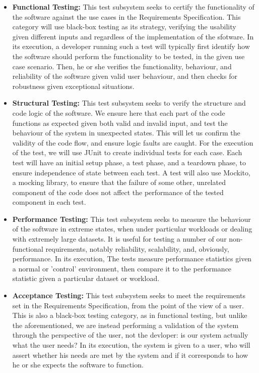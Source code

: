 \documentclass[12pt]{article}
\newcounter{req ID}
\begin{document}
\begin{itemize}
    \item \textbf{Functional Testing:} This test subsystem seeks to certify the functionality of the software against the use cases in the Requirements Specification. This category will use black-box testing as its strategy, verifying the usability given different inputs and regardless of the implementation of the sfotware. In its execution, a developer running such a test will typically first identify how the software should perform the functionality to be tested, in the given use case scenario. Then, he or she verifies the functionality, behaviour, and reliability of the software given valid user behaviour, and then checks for robustness given exceptional situations.
    \item \textbf{Structural Testing:} This test subsystem seeks to verify the structure and code logic of the software. We ensure here that each part of the code functions as expected given both valid and invalid input, and test the behaviour of the system in unexpected states. This will let us confirm the validity of the code flow, and ensure logic faults are caught. For the execution of the test, we will use JUnit to create individual tests for each case. Each test will have an initial setup phase, a test phase, and a teardown phase, to ensure independence of state between each test. A test will also use Mockito, a mocking library, to ensure that the failure of some other, unrelated component of the code does not affect the performance of the tested component in each test.
    \item \textbf{Performance Testing:} This test subsystem seeks to measure the behaviour of the software in extreme states, when under particular workloads or dealing with extremely large datasets. It is useful for testing a number of our non-functional requirements, notably reliability, scalability, and, obviously, performance. In its execution, The tests measure performance statistics given a normal or 'control' environment, then compare it to the performance statistic given a particular dataset or workload.
    \item \textbf{Acceptance Testing:} This test subsystem seeks to meet the requirements set in the Requirements Specification, from the point of the view of a user. This is also a black-box testing category, as in functional testing, but unlike the aforementioned, we are instead performing a validation of the system through the perspective of the user, not the devloper: is our system actually what the user needs? In its execution, the system is given to a user, who will assert whether his needs are met by the system and if it corresponds to how he or she expects the software to function.

\end{itemize}
\end{document}
